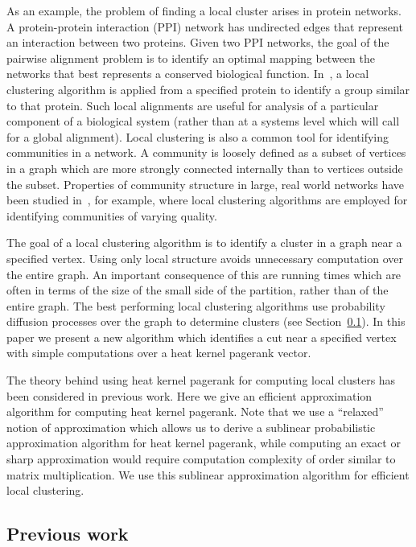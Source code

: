 \documentclass[runningheads,a4paper]{llncs}
\begin{document}
As an example, the problem of finding a local cluster arises in protein
networks.  A protein-protein interaction (PPI) network has undirected edges that
represent an interaction between two proteins.  Given two PPI networks, the goal
of the pairwise alignment problem is to identify an optimal mapping between the
networks that best represents a conserved biological function.
In~\cite{liao:protein:09}, a local clustering algorithm is applied from a
specified protein to identify a group similar to that protein.  Such local
alignments are useful for analysis of a particular component of a biological
system (rather than at a systems level which will call for a global alignment).
Local clustering is also a common tool for identifying communities in a network.
A community is loosely defined as a subset of vertices in a graph which are more
strongly connected internally than to vertices outside the subset.  Properties
of community structure in large, real world networks have been studied
in~\cite{lldm:localnetwork:08}, for example, where local clustering algorithms
are employed for identifying communities of varying quality.

The goal of a local clustering algorithm is to identify a cluster in a graph
near a specified vertex.  Using only local structure avoids unnecessary
computation over the entire graph.  An important consequence of this are running
times which are often in terms of the size of the small side of the partition,
rather than of the entire graph.  The best performing local clustering
algorithms use probability diffusion processes over the graph to determine
clusters (see Section~\ref{sec:previouswork}).  In this paper we present a new
algorithm which identifies a cut near a specified vertex with simple
computations over a heat kernel pagerank vector.

The theory behind using heat kernel pagerank for computing local clusters has
been considered in previous work.  Here we give an efficient approximation
algorithm for computing heat kernel pagerank.  Note that we use a ``relaxed''
notion of approximation which allows us to derive a sublinear probabilistic
approximation algorithm for heat kernel pagerank, while computing an exact or
sharp approximation would require computation complexity of order similar to
matrix multiplication.  We use this sublinear approximation algorithm for
efficient local clustering.

\subsection{Previous work}\label{sec:previouswork}
\end{document}
